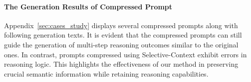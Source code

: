 


\paragraph{The Generation Results of Compressed Prompt}

Appendix~\ref{sec:cases_study} displays several compressed prompts along with following generation texts.
It is evident that the compressed prompts can still guide the generation of multi-step reasoning outcomes similar to the original ones. In contrast, prompts compressed using Selective-Context exhibit errors in reasoning logic. This highlights the effectiveness of our method in preserving crucial semantic information while retaining reasoning capabilities.

